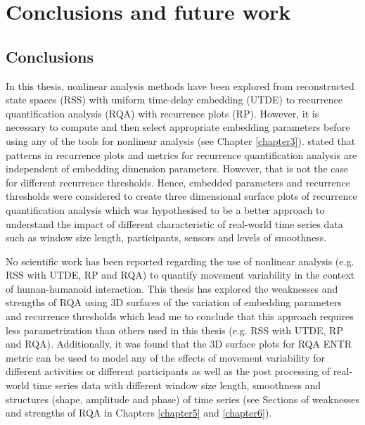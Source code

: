 \chapter{Conclusions and future work} \label{chapter7}

\section{Conclusions}
In this thesis, nonlinear analysis methods have been explored from 
reconstructed state spaces (RSS) with uniform time-delay embedding (UTDE)
to recurrence quantification analysis (RQA) with recurrence plots (RP).
However, it is necessary to compute and then select appropriate 
embedding parameters before using any of the tools for 
nonlinear analysis (see Chapter \ref{chapter3}).
\cite{iwanski1998} stated that 
patterns in recurrence plots and metrics for recurrence quantification
analysis are independent of embedding dimension parameters. 
However, that is not the case for different recurrence thresholds. 
Hence, embedded parameters and recurrence thresholds were considered 
to create three dimensional surface plots of recurrence quantification analysis 
which was hypothesised to be a better approach to understand the impact 
of different characteristic of real-world time series data 
such as window size length, participants, sensors and levels of smoothness.

No scientific work has been reported 
regarding the use of nonlinear analysis (e.g. RSS with UTDE, RP and RQA) to 
quantify movement variability in the context of human-humanoid interaction.
This thesis has explored the weaknesses and strengths of RQA
using 3D surfaces of the variation of embedding parameters and recurrence
thresholds which lead me to conclude that this approach requires 
less parametrization than others used in this thesis 
(e.g. RSS with UTDE, RP and RQA). 
Additionally, it was found that the 3D surface plots for RQA ENTR metric 
can be used to model any of the effects of movement variability for
different activities or different participants
as well as the post processing of real-world time series data 
with different window size length,
smoothness and structures (shape, amplitude and phase) of time series
(see Sections of weaknesses and strengths of RQA in Chapters 
\ref{chapter5} and \ref{chapter6}).

